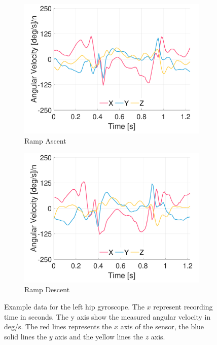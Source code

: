 \begin{figure}[p]
    \begin{subfigure}[b]{0.49\textwidth}
         \centering
         \includegraphics[width=\textwidth]{content/3-Methods/example-data/ch3_example_data_subject_01_l_hip_gyro_activity_ramp_up.pdf}
         \caption{Ramp Ascent}
    \end{subfigure}
    \begin{subfigure}[b]{0.49\textwidth}
         \centering
         \includegraphics[width=\textwidth]{content/3-Methods/example-data/ch3_example_data_subject_01_l_hip_gyro_activity_ramp_down.pdf}
         \caption{Ramp Descent}
    \end{subfigure}
    \caption[Example left hip gyroscope data]{Example data for the left hip gyroscope. The $x$ represent recording time in seconds. The y axis show the measured angular velocity in deg/s. The red lines represents the $x$ axis of the sensor, the blue solid lines the $y$ axis and the yellow lines the $z$ axis.}
    \label{fig:example-left-hip-gyro-sensor-data}
\end{figure}

